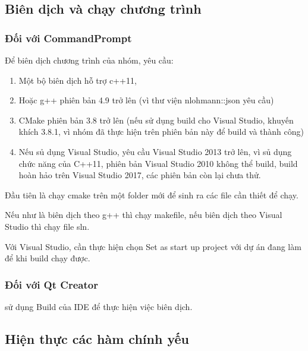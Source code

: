 \documentclass[12pt,a4paper]{report}
\begin{document}
        \subsection{Biên dịch và chạy chương trình}
        \subsubsection{Đối với CommandPrompt}
            Để biên dịch chương trình của nhóm, yêu cầu:
            \begin{enumerate}
                \item Một bộ biên dịch hỗ trợ c++11,
                \item Hoặc g++ phiên bản 4.9 trở lên (vì thư viện nlohmann::json yêu cầu)
                \item CMake phiên bản 3.8 trở lên (nếu sử dụng build cho Visual Studio, khuyến khích 3.8.1, vì nhóm đã thực hiện trên phiên bản này để build và thành công)
                \item Nếu sủ dụng Visual Studio, yêu cầu Visual Studio 2013 trở lên, vì sủ dụng chức năng của C++11, phiên bản Visual Studio 2010 không thể build, build hoàn hảo trên Visual Studio 2017, các phiên bản còn lại chưa thử.
            \end{enumerate}
            Đầu tiên là chạy cmake trên một folder mới để sinh ra các file cần thiết để chạy.\par
            Nếu như là biên dịch theo g++ thì chạy makefile, nếu biên dịch theo Visual Studio thì chạy file sln.\par
            Với Visual Studio, cần thực hiện chọn Set as start up project với dự án đang làm để khi build chạy được.\par
        \subsubsection{Đối với Qt Creator}
            sử dụng Build của IDE để thực hiện việc biên dịch.
        \subsection{Hiện thực các hàm chính yếu}
\end{document}
